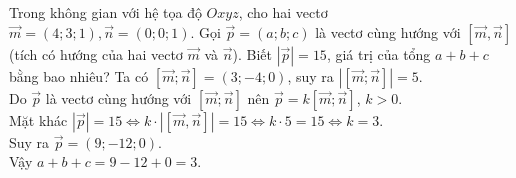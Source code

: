 \begin{ex}%
	Trong không gian với hệ tọa độ $O x y z$, cho hai vectơ $\overrightarrow{m}=(4; 3; 1), \overrightarrow{n}=(0; 0; 1)$. Gọi $\overrightarrow{p}=\left(a;b;c\right)$ là vectơ cùng hướng với $[\overrightarrow{m}, \overrightarrow{n}]$ (tích có hướng của hai vectơ $\overrightarrow{m}$ và $\overrightarrow{n}$). Biết $|\overrightarrow{p}|=15$, giá trị của tổng $a+b+c$ bằng bao nhiêu?
	\loigiai
	{
		Ta có  $[\overrightarrow{m}; \overrightarrow{n}]=(3;-4; 0)$, suy ra $|[\overrightarrow{m}; \overrightarrow{n}]|=5$.\\
		Do $\overrightarrow{p}$ là vectơ cùng hướng với $[\overrightarrow{m}; \overrightarrow{n}]$ nên $\overrightarrow{p}=k[\overrightarrow{m}; \overrightarrow{n}]$, $k>0$.\\
		Mặt khác $|\overrightarrow{p}|=15 \Leftrightarrow k \cdot|[\overrightarrow{m}, \overrightarrow{n}]| =15 \Leftrightarrow k\cdot 5=15 \Leftrightarrow k=3$.\\
		Suy ra $\overrightarrow{p}=(9;-12; 0)$.	\\
		Vậy $a+b+c=9-12+0=3$.
	}
\end{ex}
